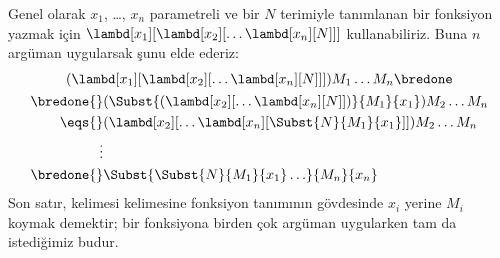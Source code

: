 Genel olarak $x_1$, \dots, $x_n$ parametreli ve bir $N$ terimiyle tanımlanan
bir fonksiyon yazmak için
$\lambd[x_1][\lambd[x_2][\ldots\lambd[x_n][N]]]$ kullanabiliriz. Buna $n$
argüman uygularsak şunu elde ederiz:
\begin{multline*}
  (\lambd[x_1][\lambd[x_2][\ldots\lambd[x_n][N]]]) M_1 \dots M_n \bredone\\
  \begin{aligned}
  \bredone {} & (\Subst{(\lambd[x_2][\ldots\lambd[x_n][N]])}{M_1}{x_1}) M_2
  \dots M_n\\
   \eqs {} & (\lambd[x_2][\ldots\lambd[x_n][\Subst{N}{M_1}{x_1}]]) M_2
            \dots M_n \\
  \vdots & \\
  \bredone {} &\Subst{\Subst{N}{M_1}{x_1}\ldots}{M_n}{x_n}
  \end{aligned}
\end{multline*}
Son satır, kelimesi kelimesine fonksiyon tanımının gövdesinde $x_i$ yerine
$M_i$ koymak demektir; bir fonksiyona birden çok argüman uygularken tam da
istediğimiz budur.
